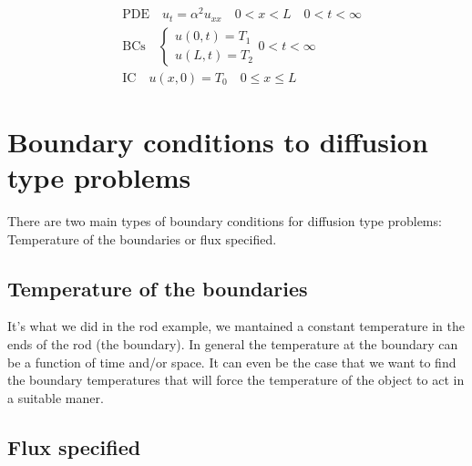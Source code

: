 \documentclass[../pde.tex]{subfiles}
\begin{document}
    \begin{align*}
        &\text{PDE} \quad u_{t} = \alpha^2 u_{xx} \quad 0<x<L \quad 0<t<\infty \\[1em]
        &\text{BCs} \quad 
        \begin{cases}
            u(0,t) = T_1\\
            u(L,t) = T_2
        \end{cases} 
        0< t<\infty \\[1em]
        &\text{IC} \quad u(x,0) = T_0 \quad 0\le x \le L
    \end{align*}


    \section{\sffamily Boundary conditions to diffusion type problems}
    
    There are two main types of boundary conditions for diffusion type problems: Temperature of the boundaries or flux specified. 
    \subsection{\sffamily Temperature of the boundaries}
    It's what we did in the rod example, we mantained a constant temperature in the ends of the rod (the boundary). In general the
    temperature at the boundary can be a function of time and/or space. It can even be the case that we want to find the boundary
    temperatures that will force the temperature of the object to act in a suitable maner. 

    \subsection{\sffamily Flux specified}
    
   
    
\end{document}

